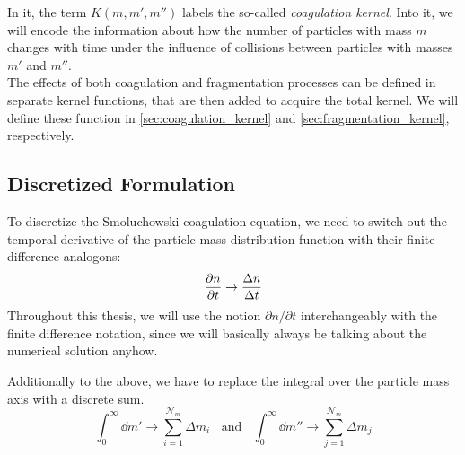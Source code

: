     In it, the term $K(m, m', m'')$ labels the so-called \textit{coagulation kernel}. 
    Into it, we will encode the information about how the number of particles with mass $m$ 
    changes with time under the influence of collisions between particles with masses 
    $m'$ and $m''$. \\

    The effects of both coagulation and fragmentation processes can be defined in separate 
    kernel functions, that are then added to acquire the total kernel. We will define 
    these function in \cref{sec:coagulation_kernel} and \cref{sec:fragmentation_kernel},
    respectively.




 

    \newpage\subsection{Discretized Formulation}

        To discretize the Smoluchowski coagulation equation, we need to 
        switch out the temporal derivative of the particle mass distribution function
        with their finite difference analogons:
        \begin{equation}
            \frac{\partial n}{\partial t} \to \frac{\Delta n}{\Delta t}
        \end{equation}
        Throughout this thesis, we will use the notion $\partial n/\partial t$ interchangeably
        with the finite difference notation, since we will basically always be talking about
        the numerical solution anyhow.

        Additionally to the above, we have to replace the integral over the particle mass axis 
        with a discrete sum.
        \begin{equation}
            \int_0^\infty \dd m' \to \sum_{i=1}^{\mathcal N_m} \Delta m_i
            \ \ \ \ \text{and}\ \ \ \
            \int_0^\infty \dd m'' \to \sum_{j=1}^{\mathcal N_m} \Delta m_j
        \end{equation} 

